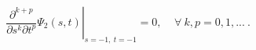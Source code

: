 \begin{equation}
{\left.
\frac{\partial^{k+p}}{\partial s^{k}\partial
t^p}\Psi_2(s,t)
\right|}_{s=-1, \ t=-1} =0,\ \ \ \ \ \forall \ k,p=0,1,... \ .
\label{16}
\end{equation}

